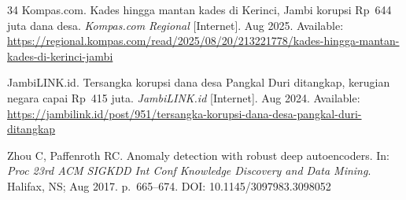 \documentclass[3p,times,procedia]{elsarticle}
\begin{document}
\begin{thebibliography}{34}
Kompas.com. Kades hingga mantan kades di Kerinci, Jambi korupsi Rp~644 juta dana desa. \textit{Kompas.com Regional} [Internet]. Aug 2025. Available: \url{https://regional.kompas.com/read/2025/08/20/213221778/kades-hingga-mantan-kades-di-kerinci-jambi}

JambiLINK.id. Tersangka korupsi dana desa Pangkal Duri ditangkap, kerugian negara capai Rp~415 juta. \textit{JambiLINK.id} [Internet]. Aug 2024. Available: \url{https://jambilink.id/post/951/tersangka-korupsi-dana-desa-pangkal-duri-ditangkap}

Zhou C, Paffenroth RC. Anomaly detection with robust deep autoencoders. In: \textit{Proc 23rd ACM SIGKDD Int Conf Knowledge Discovery and Data Mining}. Halifax, NS; Aug 2017. p.\ 665--674. DOI: 10.1145/3097983.3098052

\end{thebibliography}
\end{document}
